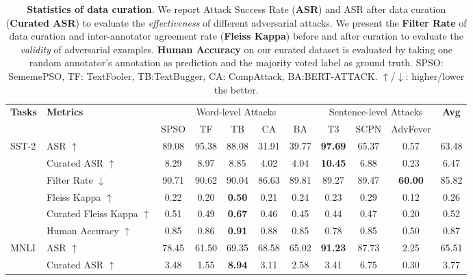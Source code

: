 \documentclass{article}
\begin{document}
\begin{table}[t]
\small
\centering
    \caption{\small \textbf{Statistics of data curation}. We report  Attack Success Rate (\textbf{ASR}) and  ASR after data curation (\textbf{Curated ASR}) to evaluate the \textit{effectiveness} of different adversarial attacks. We  present the \textbf{Filter Rate} of data curation and inter-annotator agreement rate (\textbf{Fleiss Kappa}) before and after curation to evaluate the \textit{validity} of adversarial examples. \textbf{Human Accuracy} on our curated dataset is evaluated by taking one random annotator's annotation as prediction and the majority voted label as ground truth. SPSO: SememePSO, TF: TextFooler, TB:TextBugger, CA: CompAttack, BA:BERT-ATTACK. $\uparrow$/$\downarrow$: higher/lower the better.}
    \label{tab:curation}
{
{
\setlength{\tabcolsep}{3.75pt}
    \begin{tabular}{ll|cccccccc|c}
    \toprule
         \multirow{2}{*}{\textbf{Tasks}} & \multirow{2}{*}{\textbf{Metrics}} & \multicolumn{5}{c}{Word-level Attacks} & \multicolumn{3}{c|}{Sentence-level Attacks} & \multirow{2}{*}{\textbf{Avg}} \\
         \cmidrule(lr){3-7} \cmidrule(lr){8-10}
         & & SPSO & TF & TB & CA &  BA & T3 & SCPN & AdvFever &    \\
        \midrule
          \multirow{6}{*}{SST-2} & ASR $\uparrow$ & 89.08 & 95.38 & 88.08 & 31.91 & 39.77 & \textbf{97.69} & 65.37 & 0.57 & 63.48 \\
           & Curated ASR $\uparrow$ & 8.29 & 8.97 & 8.85 & 4.02 & 4.04 & \textbf{10.45} & 6.88 & 0.23 & 6.47 \\
           & Filter Rate $\downarrow$ & 90.71 & 90.62 & 90.04 & 86.63 & 89.81 & 89.27 & 89.47 & \textbf{60.00} & 85.82 \\
           & Fleiss Kappa $\uparrow$  & 0.22 & 0.20 & \textbf{0.50} & 0.21 & 0.24 & 0.23 & 0.29 & 0.12 & 0.26 \\
           & Curated Fleiss Kappa $\uparrow$  & 0.51 & 0.49 & \textbf{0.67} & 0.46 & 0.45 & 0.44 & 0.47 & 0.20 & 0.52 \\
           & Human Accuracy $\uparrow$ & 0.85 & 0.86 & \textbf{0.91} & 0.88 & 0.85 & 0.78 & 0.85 & 0.50 & 0.87 \\
           \midrule
           \multirow{6}{*}{MNLI} & ASR $\uparrow$ & 78.45 & 61.50 & 69.35 & 68.58 & 65.02 & \textbf{91.23} & 87.73 & 2.25 & 65.51 \\
           & Curated ASR $\uparrow$ & 3.48 & 1.55 & \textbf{8.94} & 3.11 & 2.58 & 3.41 & 6.75 & 0.30 & 3.77 \\

\end{tabular}}}
\end{table}
\end{document}
